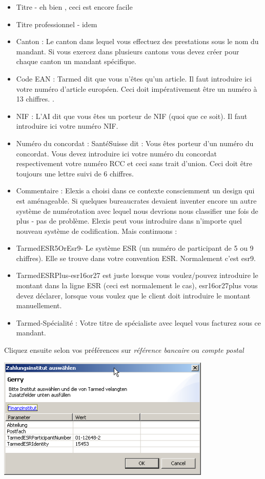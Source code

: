 \begin{itemize}



\item Titre - eh bien , ceci est encore facile
\item Titre professionnel - idem
\item Canton : Le canton dans lequel vous effectuez des prestations sous le nom du mandant. Si vous exercez dans plusieurs cantons vous devez créer pour chaque canton un mandant spécifique.
\item Code EAN : Tarmed dit que vous n'êtes qu'un article. Il faut introduire ici votre numéro d'article européen. Ceci doit impérativement être un numéro à 13 chiffres. .
\item NIF : L'AI dit que vous êtes un porteur de NIF (quoi que ce soit). Il faut introduire ici votre numéro NIF.
\item Numéro du concordat : SantéSuisse dit : Vous êtes porteur d'un numéro du concordat. Vous devez introduire ici votre numéro du concordat respectivement votre numéro RCC et ceci sans trait d'union. Ceci doit être toujours une lettre suivi de 6 chiffres.
\item Commentaire : Elexis a choisi dans ce contexte consciemment un design qui est aménageable. Si quelques bureaucrates devaient inventer encore un autre système de numérotation avec lequel nous devrions nous classifier une fois de plus - pas de problème. Elexis peut vous introduire dans n'importe quel nouveau système de codification. Mais continuons :
\item TarmedESR5OrEsr9- Le système ESR (un numéro de participant de 5 ou 9 chiffres).
Elle se trouve dans votre convention ESR. Normalement c'est esr9.

\item TarmedESRPlus-esr16or27 est juste lorsque vous voulez/pouvez introduire le montant dans la ligne ESR (ceci est normalement le cas), esr16or27plus vous devez déclarer, lorsque vous voulez que le client doit introduire le montant manuellement.
\item Tarmed-Spécialité : Votre titre de spécialiste avec lequel vous facturez sous ce mandant.
\end{itemize}
Cliquez ensuite selon vos préférences sur   \textit{référence bancaire} ou  \textit{compte postal}

\includegraphics[width=4in]{images/tarmed4.png}


